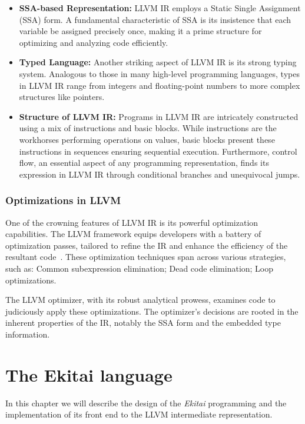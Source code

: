 \documentclass[
  oneside,
  english,
  coorientadorbanca,
  noabntexcite
]{ufsc-thesis-rn46-2019}
\begin{document}
\begin{itemize}
  \item \textbf{SSA-based Representation:} LLVM IR employs a Static Single Assignment (SSA) form.
        A fundamental characteristic of SSA is its insistence that each variable be assigned precisely once, making it a prime structure for optimizing and analyzing code efficiently.

  \item \textbf{Typed Language:} Another striking aspect of LLVM IR is its strong typing system.
        Analogous to those in many high-level programming languages, types in LLVM IR range from integers and floating-point numbers to more complex structures like pointers.

  \item \textbf{Structure of LLVM IR:} Programs in LLVM IR are intricately constructed using a mix of instructions and basic blocks.
        While instructions are the workhorses performing operations on values, basic blocks present these instructions in sequences ensuring sequential execution.
        Furthermore, control flow, an essential aspect of any programming representation, finds its expression in LLVM IR through conditional branches and unequivocal jumps.
\end{itemize}

\subsection{Optimizations in LLVM}

One of the crowning features of LLVM IR is its powerful optimization capabilities.
The LLVM framework equips developers with a battery of optimization passes, tailored to refine the IR and enhance the efficiency of the resultant code~\cite{10.1145/3276495}.
These optimization techniques span across various strategies, such as: Common subexpression elimination; Dead code elimination; Loop optimizations.

The LLVM optimizer, with its robust analytical prowess, examines code to judiciously apply these optimizations. The optimizer's decisions are rooted in the inherent properties of the IR, notably the SSA form and the embedded type information.

\chapter{The Ekitai language}\label{chapter:proposal}

In this chapter we will describe the design of the \textit{Ekitai} programming and the implementation of its front end to the LLVM intermediate representation.
\end{document}
